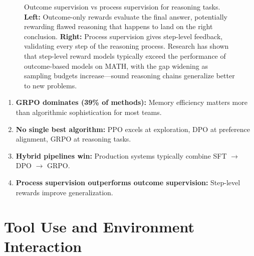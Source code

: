 \documentclass[12pt,a4paper]{report}
\theoremstyle{definition}
\begin{document}
\begin{figure}[htbp]
\caption{Outcome supervision vs process supervision for reasoning tasks. \textbf{Left:} Outcome-only rewards evaluate the final answer, potentially rewarding flawed reasoning that happens to land on the right conclusion. \textbf{Right:} Process supervision gives step-level feedback, validating every step of the reasoning process.
 Research has shown that step-level reward models typically exceed the performance of outcome-based models on MATH, with the gap widening as sampling budgets increase---sound reasoning chains generalize better to new problems.
}
\label{fig:process_supervision}
\end{figure}

\begin{tcolorbox}[colback=blue!5!white, colframe=blue!75!black, title=\textbf{Chapter 2 Key Takeaways}]
\begin{enumerate}
    \item \textbf{GRPO dominates (39\% of methods):} Memory efficiency matters more than algorithmic sophistication for most teams.
    \item \textbf{No single best algorithm:} PPO excels at exploration, DPO at preference alignment, GRPO at reasoning tasks.
    \item \textbf{Hybrid pipelines win:} Production systems typically combine SFT $\rightarrow$ DPO $\rightarrow$ GRPO.
    \item \textbf{Process supervision outperforms outcome supervision:} Step-level rewards improve generalization.
\end{enumerate}
\end{tcolorbox}

\chapter{Tool Use and Environment Interaction}
\label{ch:tooluse}
\end{document}
